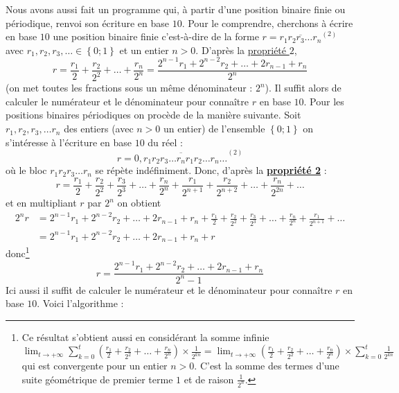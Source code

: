 \documentclass[a4paper,french,12pt]{article}
\begin{document}
Nous avons aussi fait un programme qui, à partir d'une position binaire finie ou périodique, renvoi son écriture en base $10$. Pour le comprendre, cherchons à écrire en base $10$ une position binaire finie c'est-à-dire de la forme $r=\overline{r_1r_2r_3\ldots r_n}^{\left(2\right)}$ avec $r_1,r_2,r_3,\ldots\in\left\{0;1\right\}$ et un entier $n>0$. D'après la \hyperlink{5}{propriété $2$}, 
\[r=\frac{r_1}{2}+\frac{r_2}{2^2}+\ldots+\frac{r_n}{2^n}=\frac{2^{n-1}r_1+2^{n-2}r_2+\ldots+2r_{n-1}+r_n}{2^n}\]
(on met toutes les fractions sous un même dénominateur : $2^n$). Il suffit alors de calculer le numérateur et le dénominateur pour connaître $r$ en base $10$. 
\hypertarget{14}{}
Pour les positions binaires périodiques on procède de la manière suivante. Soit $r_1,r_2,r_3,\ldots r_n$ des entiers (avec $n>0$ un entier) de l'ensemble $\left\{0;1\right\}$ on s'intéresse à l'écriture en base $10$ du réel :
\[r=\overline{0,r_1r_2r_3\ldots r_nr_1r_2\ldots r_n\ldots}^{\left(2\right)}\]
où le bloc $r_1r_2r_3\ldots r_n$ se répète indéfiniment. Donc, d'après la \hyperlink{5}{\textbf{propriété 2}} :
\[r=\frac{r_1}{2}+\frac{r_2}{2^2}+\frac{r_3}{2^3}+\ldots+\frac{r_n}{2^n}+\frac{r_1}{2^{n+1}}+\frac{r_2}{2^{n+2}}+\ldots+\frac{r_n}{2^{2n}}+\ldots\]
et en multipliant $r$ par $2^n$ on obtient 
\begin{align*}
2^nr&=2^{n-1}r_1+2^{n-2}r_2+\ldots+2r_{n-1}+r_n+\frac{r_1}{2}+\frac{r_2}{2^2}+\frac{r_3}{2^3}+\ldots+\frac{r_n}{2^n}+\frac{r_1}{2^{n+1}}+\ldots\\
&=2^{n-1}r_1+2^{n-2}r_2+\ldots+2r_{n-1}+r_n+r
\end{align*}
donc\footnote{Ce résultat s'obtient aussi en considérant la somme infinie ${\displaystyle\lim_{t\to+\infty}\sum_{k=0}^t\left(\frac{r_1}{2}+\frac{r_2}{2^2}+\ldots+\frac{r_n}{2^n}\right)\times\frac{1}{2^{kn}}}={\displaystyle\lim_{t\to+\infty}\left(\frac{r_1}{2}+\frac{r_2}{2^2}+\ldots+\frac{r_n}{2^n}\right)\times\sum_{k=0}^t\frac{1}{2^{kn}}}$ qui est convergente pour un entier $n>0$. C'est la somme des termes d'une suite géométrique de premier terme $1$ et de raison $\frac{1}{2^n}$.}
\hypertarget{11}{}
\[r=\frac{2^{n-1}r_1+2^{n-2}r_2+\ldots+2r_{n-1}+r_n}{2^n-1}\]
Ici aussi il suffit de calculer le numérateur et le dénominateur pour connaître $r$ en base $10$. Voici l'algorithme :
\end{document}
